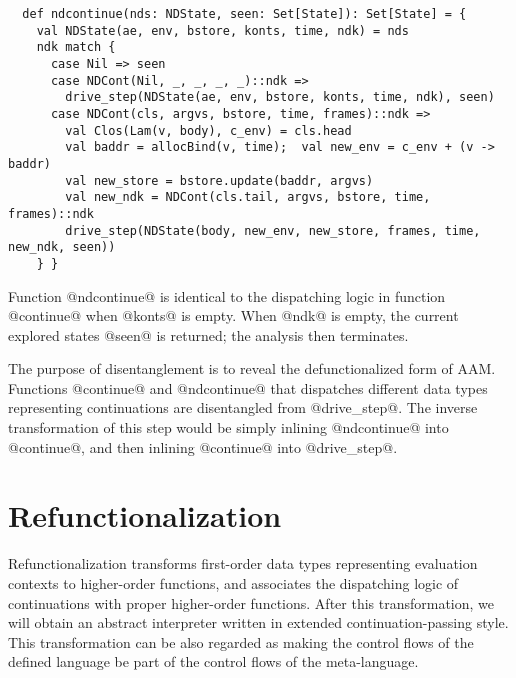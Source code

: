 \documentclass[acmsmall, review]{acmart}\settopmatter{}
\begin{document}
\begin{lstlisting}
  def ndcontinue(nds: NDState, seen: Set[State]): Set[State] = {
    val NDState(ae, env, bstore, konts, time, ndk) = nds
    ndk match {
      case Nil => seen
      case NDCont(Nil, _, _, _, _)::ndk =>
        drive_step(NDState(ae, env, bstore, konts, time, ndk), seen) 
      case NDCont(cls, argvs, bstore, time, frames)::ndk =>
        val Clos(Lam(v, body), c_env) = cls.head
        val baddr = allocBind(v, time);  val new_env = c_env + (v -> baddr)
        val new_store = bstore.update(baddr, argvs)
        val new_ndk = NDCont(cls.tail, argvs, bstore, time, frames)::ndk
        drive_step(NDState(body, new_env, new_store, frames, time, new_ndk, seen))
    } }
\end{lstlisting}

Function @ndcontinue@ is identical to the dispatching logic in function @continue@ when @konts@ is empty.
When @ndk@ is empty, the current explored states @seen@ is returned; the analysis then terminates.
\iffalse
The shape for @ndcontinue@ is similar to @continue@; after all, they both use a 
@List@ representation for continuations. When the closure set is empty, we recursively 
call @drive_step@ with the rest of @ndk@, since in this case the continuation 
@konts@ is still empty, so the state will be dispatched to @ndcontinue@ again.
Otherwise, we invoke @drive_step@ with the a new @NDState@ where the control 
is transferred to the body expression of the next closure object.
\fi

The purpose of disentanglement is to reveal the defunctionalized form of AAM.
Functions @continue@ and @ndcontinue@ that dispatches different data types representing 
continuations are disentangled from @drive_step@. 
The inverse transformation of this step would be simply inlining @ndcontinue@ into @continue@,
and then inlining @continue@ into @drive_step@.

\section{Refunctionalization} \label{sec:refunc}

Refunctionalization transforms first-order data types representing evaluation contexts 
to higher-order functions, and associates the dispatching logic of continuations with
proper higher-order functions.
After this transformation, we will obtain an abstract interpreter written in extended
continuation-passing style\cite{Danvy:1990:AC:91556.91622}.
This transformation can be also regarded as making the control flows of the defined 
language be part of the control flows of the meta-language.
\end{document}
